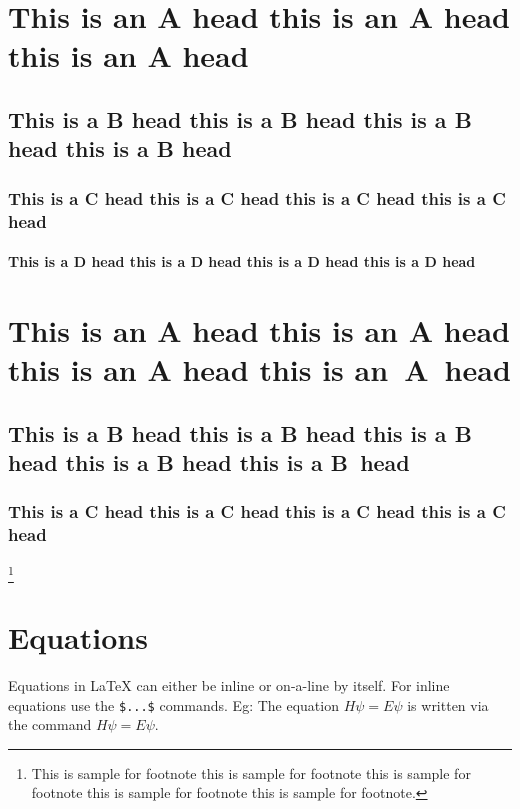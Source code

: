 \documentclass{CUP-JNL-DTM}%
\theoremstyle{definition}
\numberwithin{equation}{section}
\begin{document}
\section[This is an A Head]{This is an A head this is an A head this is an A head}
\lipsum[1]

\subsection{This is a B head this is a B head this is a B head this is a B head}

\lipsum[2]

\subsubsection{This is a C head this is a C head this is a C head this is a C head}

\lipsum[3]

\paragraph{This is a D head this is a D head this is a D head this is a D head}

\lipsum[4]

\section[This is an A Head]{This is an A head this is an A head this is an A head this is an~A~head}
\subsection{This is a B head this is a B head this is a B head this is a B head this is a B~head}
\subsubsection{This is a C head this is a C head this is a C head this is a C head}
\lipsum[4]\footnote{This is sample for footnote this is sample for footnote this is sample for footnote  this is sample for footnote this is sample for footnote.}

\section{Equations}

Equations in \LaTeX{} can either be inline or on-a-line by itself. For
inline equations use the \verb+$...$+ commands. Eg: The equation
$H\psi = E \psi$ is written via the command $H \psi = E \psi$.
\end{document}
